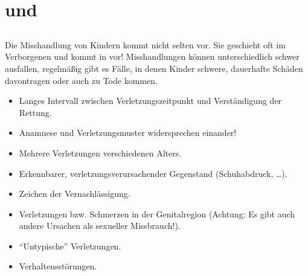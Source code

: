 

\section{ und }

\subsection{}
\label{topic:kindesmisshandlung}

\Text
{{\TxBeschreibung}}%
{%
Die Misshandlung von Kindern kommt nicht selten
vor. Sie geschieht oft im Verborgenen und kommt in  vor! Misshandlungen können
unterschiedlich schwer ausfallen, regelmäßig gibt es Fälle,
in denen Kinder schwere, dauerhafte Schäden davontragen oder
auch zu Tode kommen.
}%


{
\begin{itemize}
  \item Langes Intervall zwischen  Verletzungszeitpunkt und Verständigung der
  Rettung.
  \item Anamnese und Verletzungsmuster  widersprechen einander!
  \item Mehrere Verletzungen verschiedenen Alters.
  \item Erkennbarer, verletzungsverursachender Gegenstand (Schuhabdruck,
  \ldots).
  \item Zeichen der Vernachlässigung.
  \item Verletzungen bzw. Schmerzen in der Genitalregion (Achtung: Es gibt auch andere
  Ursachen als sexueller Missbrauch!).
  \item \enquote{Untypische} Verletzungen.
  \item Verhaltensstörungen.
\end{itemize}
}{}{}{}{}


